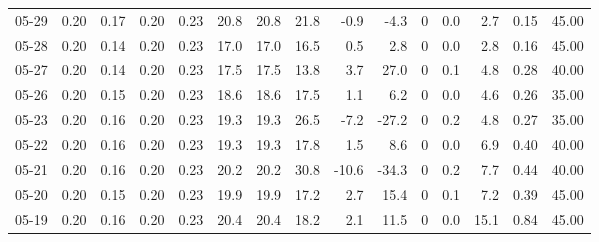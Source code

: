 \begin{threeparttable}
{\begin{tabular}{lrrrrrrrrrrrrrr}
  05-29 &          0.20 &          0.17 &          0.20 &        0.23 &                20.8 &               20.8 &                21.8 &       -0.9 &         -4.3 &              0 &                 0.0 &              2.7 &            0.15 &                  45.00 \\
  05-28 &          0.20 &          0.14 &          0.20 &        0.23 &                17.0 &               17.0 &                16.5 &        0.5 &          2.8 &              0 &                 0.0 &              2.8 &            0.16 &                  45.00 \\
  05-27 &          0.20 &          0.14 &          0.20 &        0.23 &                17.5 &               17.5 &                13.8 &        3.7 &         27.0 &              0 &                 0.1 &              4.8 &            0.28 &                  40.00 \\
  05-26 &          0.20 &          0.15 &          0.20 &        0.23 &                18.6 &               18.6 &                17.5 &        1.1 &          6.2 &              0 &                 0.0 &              4.6 &            0.26 &                  35.00 \\
  05-23 &          0.20 &          0.16 &          0.20 &        0.23 &                19.3 &               19.3 &                26.5 &       -7.2 &        -27.2 &              0 &                 0.2 &              4.8 &            0.27 &                  35.00 \\
  05-22 &          0.20 &          0.16 &          0.20 &        0.23 &                19.3 &               19.3 &                17.8 &        1.5 &          8.6 &              0 &                 0.0 &              6.9 &            0.40 &                  40.00 \\
  05-21 &          0.20 &          0.16 &          0.20 &        0.23 &                20.2 &               20.2 &                30.8 &      -10.6 &        -34.3 &              0 &                 0.2 &              7.7 &            0.44 &                  40.00 \\
  05-20 &          0.20 &          0.15 &          0.20 &        0.23 &                19.9 &               19.9 &                17.2 &        2.7 &         15.4 &              0 &                 0.1 &              7.2 &            0.39 &                  45.00 \\
  05-19 &          0.20 &          0.16 &          0.20 &        0.23 &                20.4 &               20.4 &                18.2 &        2.1 &         11.5 &              0 &                 0.0 &             15.1 &            0.84 &                  45.00 \\

\end{tabular}}
\end{threeparttable}
